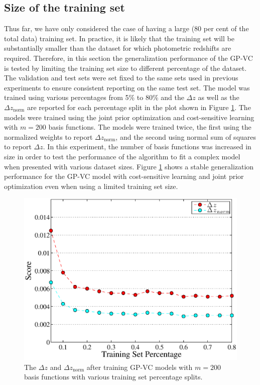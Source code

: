 \documentclass[useAMS,usenatbib,fleqn]{mn2e}
\begin{document}
\subsection{Size of the training set}
\label{sec-sizetraining}

Thus far, we have only considered the case of having a large (80 per cent of the total data) training set. In practice, it is likely that the training set will be substantially smaller than the dataset for which photometric redshifts are required. Therefore, in this section the generalization performance of the GP-VC is tested by limiting the training set size to different percentage of the dataset. The validation and test sets were set fixed to the same sets used in previous experiments to ensure consistent reporting on the same test set. The model was trained using various percentages from 5\% to 80\% and the $\Delta z$ as well as the $\Delta z_\textrm{norm}$ are reported for each percentage split in the plot shown in Figure \ref{fig-training-percentage}. The models were trained using the joint prior optimization and cost-sensitive learning with $m=200$ basis functions. The models were trained twice, the first using the normalized weights to report $\Delta z_\textrm{norm}$, and the second using normal sum of squares to report $\Delta z$. In this experiment, the number of basis functions was increased in size in order to test the performance of the algorithm to fit a complex model when presented with various dataset sizes. Figure \ref{fig-training-percentage} shows a stable generalization performance for the GP-VC model with cost-sensitive learning and joint prior optimization even when using a limited training set size. 

\begin{figure}
       \centering
        \includegraphics[width=\columnwidth]{figures/percentage.eps}
        \caption{The $\Delta z$ and $\Delta z_\textrm{norm}$ after training GP-VC models with $m=200$ basis functions with various training set percentage splits. }
       \label{fig-training-percentage}
\end{figure}
\end{document}
